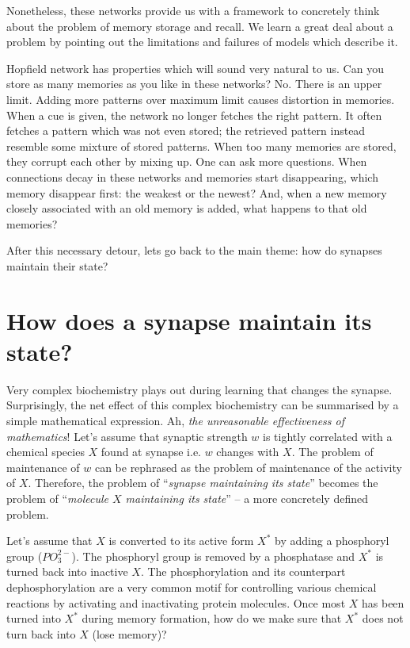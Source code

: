 \documentclass[]{resonance}
\begin{document}

Nonetheless, these networks provide us with a framework to concretely think
about the problem of memory storage and recall. We learn a great deal about a
problem by pointing out the limitations and failures of models which describe
it. 

Hopfield network has properties which will sound very natural to us. Can you
store as many memories as you like in these networks? No. There is an upper
limit. Adding more patterns over maximum limit causes distortion in memories.
When a cue is given, the network no longer fetches the right pattern. It often
fetches a pattern which was not even stored; the retrieved pattern instead
resemble some mixture of stored patterns. When too many memories are stored,
they corrupt each other by mixing up. One can ask more questions. When
connections decay in these networks and memories start disappearing, which
memory disappear first: the weakest or the newest? And, when a new memory
closely associated with an old memory is added, what happens to that old
memories?

After this necessary detour, lets go back to the main theme: how do synapses
maintain their state?

\section{How does a synapse maintain its state?}

Very complex biochemistry plays out during learning that changes the synapse.
Surprisingly, the net effect of this complex biochemistry can be summarised by a
simple mathematical expression. Ah, \emph{the unreasonable effectiveness of
mathematics}\cite{unreasonable_math}! Let's assume that synaptic strength $w$ is
tightly correlated with a chemical species $X$ found at synapse i.e. $w$ changes
with $X$. The problem of maintenance of $w$ can be rephrased as the problem of
maintenance of the activity of $X$. Therefore, the problem of ``\emph{synapse
maintaining its state}'' becomes the problem of ``\emph{molecule $X$ maintaining
its state}'' -- a more concretely defined problem.

Let's assume that $X$ is converted to its active form $X^*$  by adding a
phosphoryl group ($PO_3^{2-}$). The phosphoryl group is removed by a phosphatase
and $X^*$ is turned back into inactive $X$. The phosphorylation and its
counterpart dephosphorylation are a very common motif for controlling various
chemical reactions by activating and inactivating protein molecules. Once most
$X$ has been turned into $X^*$ during memory formation, how do we make sure that
$X^*$ does not turn back into $X$ (lose memory)?
\end{document}

